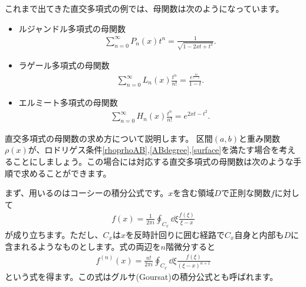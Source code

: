 \documentclass[report,paper=a4, fontsize=12pt, line_length=16cm, number_of_lines=33,dvipdfmx]{jlreq}
\newenvironment{important}{\begin{tcolorbox}[
  colback = white,
  colframe = red!35,
  boxrule = 2mm,
  fonttitle = \bfseries,
  after = \noindent] }{\end{tcolorbox}}
\numberwithin{equation}{section}
\begin{document}
これまで出てきた直交多項式の例では、母関数は次のようになっています。
\begin{important}
\begin{itemize}
  \item ルジャンドル多項式の母関数
  \begin{align}
    \sum_{n=0}^{\infty}P_n(x)t^n=\frac{1}{\sqrt{1-2xt+t^2}}.\label{Legendregenfunc}
  \end{align}  
  \item ラゲール多項式の母関数
  \begin{align}
    \sum_{n=0}^{\infty}L_n(x)\frac{t^n}{n!}=\frac{e^{\frac{tx}{t-1}}}{1-t}.
  \end{align}  
  \item エルミート多項式の母関数
  \begin{align}
    \sum_{n=0}^{\infty}H_n(x)\frac{t^n}{n!}=e^{2xt-t^2}.
  \end{align}
\end{itemize}
\end{important}

直交多項式の母関数の求め方について説明します。
区間$(a,b)$と重み関数$\rho(x)$が、ロドリゲス条件\eqref{rhoprhoAB},\eqref{ABdegree},\eqref{surface}を満たす場合を考えることにしましょう。この場合には対応する直交多項式の母関数は次のような手順で求めることができます。

まず、用いるのはコーシーの積分公式です。$x$を含む領域$D$で正則な関数$f$に対して
\begin{align}
  f(x)=\frac{1}{2\pi i}\oint_{C_x}\dd{\xi} \frac{f(\xi)}{\xi-x}
  \label{Cauchyintegralformula}
\end{align}
が成り立ちます。ただし、$C_x$は$x$を反時計回りに囲む経路で$C_x$自身と内部も$D$に含まれるようなものとします。式の両辺を$n$階微分すると
\begin{align}
  f^{(n)}(x)=\frac{n!}{2\pi i}\oint_{C_x}\dd{\xi} \frac{f(\xi)}{(\xi-x)^{n+1}}\label{Goursatintegralformula}
\end{align}
という式を得ます。この式はグルサ(Goursat)の積分公式とも呼ばれます。
\end{document}

